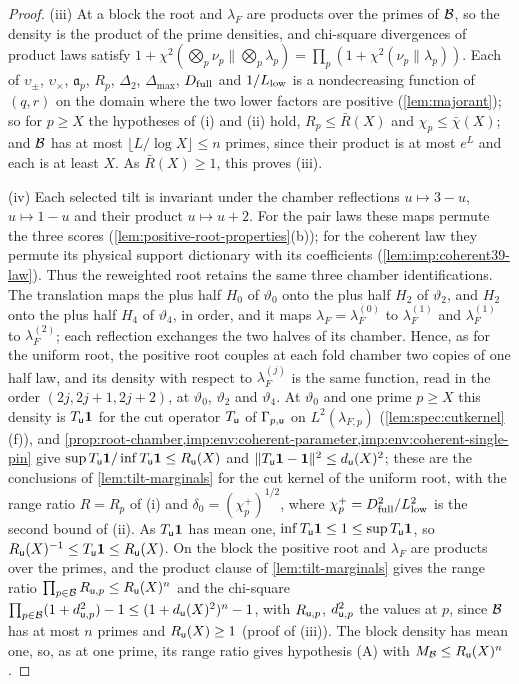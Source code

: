 \begin{proof}
(iii) At a block the root and $\lambda_F$ are products over the primes of
$\mathcal B$, so the density is the product of the prime densities, and chi-square
divergences of product laws satisfy
$1+\chi^2(\bigotimes_p\nu_p\|\bigotimes_p\lambda_p)=\prod_p(1+\chi^2(\nu_p\|
\lambda_p))$. Each of $\upsilon_\pm$, $\upsilon_\times$, $\mathfrak a_p$, $R_p$,
$\Delta_2$, $\Delta_{\max}$, $D_{\rm full}$ and $1/L_{\rm low}$ is a nondecreasing
function of $(q,r)$ on the domain where the two lower factors are
positive (\cref{lem:majorant}); so for $p\ge X$ the hypotheses of (i) and (ii)
hold, $R_p\le\bar R(X)$ and $\chi_p\le\bar\chi(X)$; and $\mathcal B$ has at most
$\lfloor L/\log X\rfloor\le n$ primes,
since their product is at most $e^L$ and each is at least $X$. As
$\bar R(X)\ge1$, this proves (iii).

(iv) Each selected tilt is invariant under the chamber reflections
$u\mapsto3-u$, $u\mapsto1-u$ and their product $u\mapsto u+2$.
For the pair laws these maps permute the three scores
(\cref{lem:positive-root-properties}(b)); for the coherent law they
permute its physical support dictionary with its coefficients
(\cref{lem:imp:coherent39-law}). Thus the reweighted root retains the
same three chamber identifications. The
translation maps the plus half $H_0$ of $\vartheta_0$ onto the plus half $H_2$ of
$\vartheta_2$, and $H_2$ onto the plus half $H_4$ of $\vartheta_4$, in order, and it
maps $\lambda_F=\lambda_F^{(0)}$ to $\lambda_F^{(1)}$ and $\lambda_F^{(1)}$ to
$\lambda_F^{(2)}$; each reflection exchanges the two halves of its chamber. Hence,
as for the uniform root, the positive root couples at each fold chamber two
copies of one half law, and its density with respect to $\lambda_F^{(j)}$ is the
same function, read in the order $(2j,2j+1,2j+2)$, at $\vartheta_0$, $\vartheta_2$
and $\vartheta_4$. At $\vartheta_0$ and one prime $p\ge X$ this density is $T_\mathsf u\mathbf 1$
for the cut operator $T_\mathsf u$ of $\Gamma_{p,\mathsf u}$ on $L^2(\lambda_{F,p})$
(\cref{lem:spec:cutkernel}(f)), and
\cref{prop:root-chamber,imp:env:coherent-parameter,imp:env:coherent-single-pin}
give $\sup T_\mathsf u\mathbf 1/\inf T_\mathsf u\mathbf 1\le R_\mathsf u(X)$ and
$\|T_\mathsf u\mathbf 1-\mathbf 1\|^2\le d_\mathsf u(X)^2$; these are the conclusions of
\cref{lem:tilt-marginals} for the cut kernel of the uniform root, with the range
ratio $R=R_p$ of (i) and $\delta_0=(\chi^+_p)^{1/2}$, where
$\chi^+_p=D_{\rm full}^2/L_{\rm low}^2$ is the second bound of (ii). As
$T_\mathsf u\mathbf 1$ has mean one,
$\inf T_\mathsf u\mathbf 1\le1\le\sup T_\mathsf u\mathbf 1$, so $R_\mathsf u(X)^{-1}\le T_\mathsf u\mathbf 1\le
R_\mathsf u(X)$. On the block the positive root and $\lambda_F$ are products over the
primes, and the product clause of \cref{lem:tilt-marginals} gives the range
ratio $\prod_{p\in\mathcal B}R_{\mathsf u,p}\le R_\mathsf u(X)^n$ and the chi-square
$\prod_{p\in\mathcal B}(1+d_{\mathsf u,p}^2)-1\le(1+d_\mathsf u(X)^2)^n-1$, with
$R_{\mathsf u,p}$, $d^2_{\mathsf u,p}$ the values at $p$, since $\mathcal B$ has at most $n$ primes
and $R_\mathsf u(X)\ge1$ (proof of (iii)). The block density has mean one, so, as
at one prime, its range ratio gives hypothesis (A) with
$M_\mathcal B\le R_\mathsf u(X)^n$.
\end{proof}

